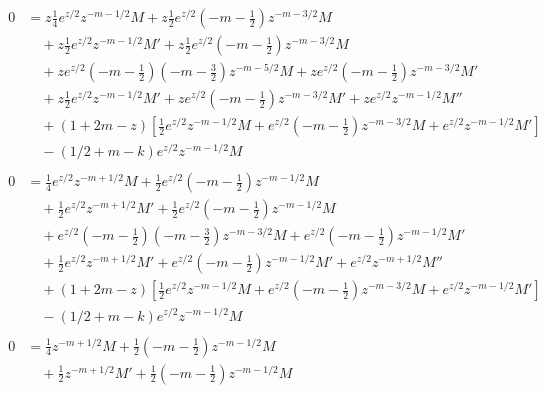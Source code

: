 \documentclass[a4paper,12pt, leqno, answers]{exam}
\begin{document}
\begin{questions}
\begin{solution}
\begin{align*}
\begin{split}
                0 &= z \frac{1}{4} e^{z/2} z^{-m - 1/2} M + z \frac{1}{2} e^{z/2} \left( -m - \frac{1}{2} \right) z^{-m - 3/2} M \\
                &\quad {}+ z \frac{1}{2} e^{z/2} z^{-m - 1/2} M' + z \frac{1}{2} e^{z/2} \left( -m - \frac{1}{2} \right)  z^{-m - 3/2} M \\
                &\quad {}+ z e^{z/2} \left( -m - \frac{1}{2} \right) \left( -m - \frac{3}{2} \right) z^{-m - 5/2} M + z e^{z/2} \left( -m - \frac{1}{2} \right) z^{-m - 3/2} M' \\
                &\quad {}+ z \frac{1}{2} e^{z/2} z^{-m - 1/2} M' + z e^{z/2} \left( -m - \frac{1}{2} \right) z^{-m - 3/2} M' + z e^{z/2} z^{-m - 1/2} M'' \\
                &\quad {}+ (1 + 2 m - z) \left[ \frac{1}{2} e^{z/2} z^{-m - 1/2} M + e^{z/2} \left( -m - \frac{1}{2} \right) z^{-m - 3/2} M + e^{z/2} z^{-m - 1/2} M' \right] \\
                &\quad {}- (1/2 + m - k) e^{z/2} z^{-m - 1/2} M
            \end{split} \\
            \begin{split}
                0 &= \frac{1}{4} e^{z/2} z^{-m + 1/2} M + \frac{1}{2} e^{z/2} \left( -m - \frac{1}{2} \right) z^{-m - 1/2} M \\
                &\quad {}+ \frac{1}{2} e^{z/2} z^{-m + 1/2} M' + \frac{1}{2} e^{z/2} \left( -m - \frac{1}{2} \right) z^{-m - 1/2} M \\
                &\quad {}+ e^{z/2} \left( -m - \frac{1}{2} \right) \left( -m - \frac{3}{2} \right) z^{-m - 3/2} M + e^{z/2} \left( -m - \frac{1}{2} \right) z^{-m - 1/2} M' \\
                &\quad {}+ \frac{1}{2} e^{z/2} z^{-m + 1/2} M' + e^{z/2} \left( -m - \frac{1}{2} \right) z^{-m - 1/2} M' + e^{z/2} z^{-m + 1/2} M'' \\
                &\quad {}+ (1 + 2 m - z) \left[ \frac{1}{2} e^{z/2} z^{-m - 1/2} M + e^{z/2} \left( -m - \frac{1}{2} \right) z^{-m - 3/2} M + e^{z/2} z^{-m - 1/2} M' \right] \\
                &\quad {}- (1/2 + m - k) e^{z/2} z^{-m - 1/2} M
            \end{split} \\
            \begin{split}
                0 &= \frac{1}{4} z^{-m + 1/2} M + \frac{1}{2} \left( -m - \frac{1}{2} \right) z^{-m - 1/2} M \\
                &\quad {}+ \frac{1}{2} z^{-m + 1/2} M' + \frac{1}{2} \left( -m - \frac{1}{2} \right) z^{-m - 1/2} M \\

\end{split}
\end{align*}
\end{solution}
\end{questions}
\end{document}
